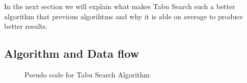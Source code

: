 In the next section we will explain what makes Tabu Search such a better algorithm that previous algorihtms and why it is able on average to produce better results.
\subsection{Algorithm and Data flow}
\begin{figure}[h]
	\centering
	\setlength \fboxsep{0pt}
	\setlength \fboxrule{0.5pt}
	\caption{Pseudo code for Tabu Search Algorithm}
	\label{fig:TSAlgorithmPseudoCode}
\end{figure}
